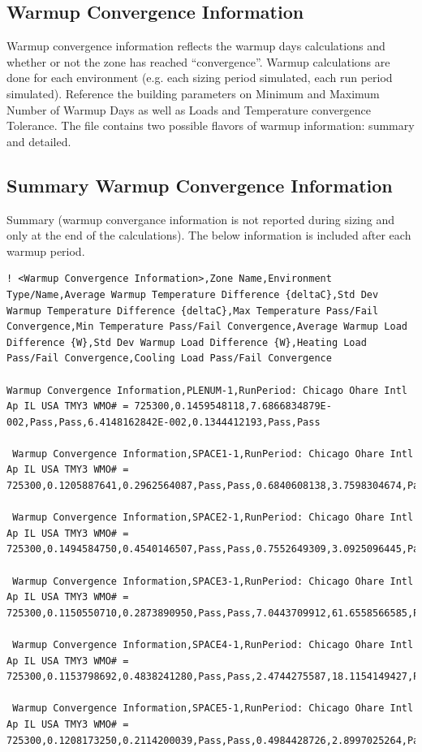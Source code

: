 \subsection{Warmup Convergence Information}

Warmup convergence information reflects the warmup days calculations and whether or not the zone has reached “convergence”. Warmup calculations are done for each environment (e.g. each sizing period simulated, each run period simulated). Reference the building parameters on Minimum and Maximum Number of Warmup Days as well as Loads and Temperature convergence Tolerance. The file contains two possible flavors of warmup information: summary and detailed.

\subsection{Summary Warmup Convergence Information}

Summary (warmup convergance information is not reported during sizing and only at the end of the calculations). The below information is included after each warmup period.

\begin{lstlisting}
! <Warmup Convergence Information>,Zone Name,Environment Type/Name,Average Warmup Temperature Difference {deltaC},Std Dev Warmup Temperature Difference {deltaC},Max Temperature Pass/Fail Convergence,Min Temperature Pass/Fail Convergence,Average Warmup Load Difference {W},Std Dev Warmup Load Difference {W},Heating Load Pass/Fail Convergence,Cooling Load Pass/Fail Convergence

Warmup Convergence Information,PLENUM-1,RunPeriod: Chicago Ohare Intl Ap IL USA TMY3 WMO# = 725300,0.1459548118,7.6866834879E-002,Pass,Pass,6.4148162842E-002,0.1344412193,Pass,Pass

 Warmup Convergence Information,SPACE1-1,RunPeriod: Chicago Ohare Intl Ap IL USA TMY3 WMO# = 725300,0.1205887641,0.2962564087,Pass,Pass,0.6840608138,3.7598304674,Pass,Pass

 Warmup Convergence Information,SPACE2-1,RunPeriod: Chicago Ohare Intl Ap IL USA TMY3 WMO# = 725300,0.1494584750,0.4540146507,Pass,Pass,0.7552649309,3.0925096445,Pass,Pass

 Warmup Convergence Information,SPACE3-1,RunPeriod: Chicago Ohare Intl Ap IL USA TMY3 WMO# = 725300,0.1150550710,0.2873890950,Pass,Pass,7.0443709912,61.6558566585,Pass,Pass

 Warmup Convergence Information,SPACE4-1,RunPeriod: Chicago Ohare Intl Ap IL USA TMY3 WMO# = 725300,0.1153798692,0.4838241280,Pass,Pass,2.4744275587,18.1154149427,Pass,Pass

 Warmup Convergence Information,SPACE5-1,RunPeriod: Chicago Ohare Intl Ap IL USA TMY3 WMO# = 725300,0.1208173250,0.2114200039,Pass,Pass,0.4984428726,2.8997025264,Pass,Pass
\end{lstlisting}

